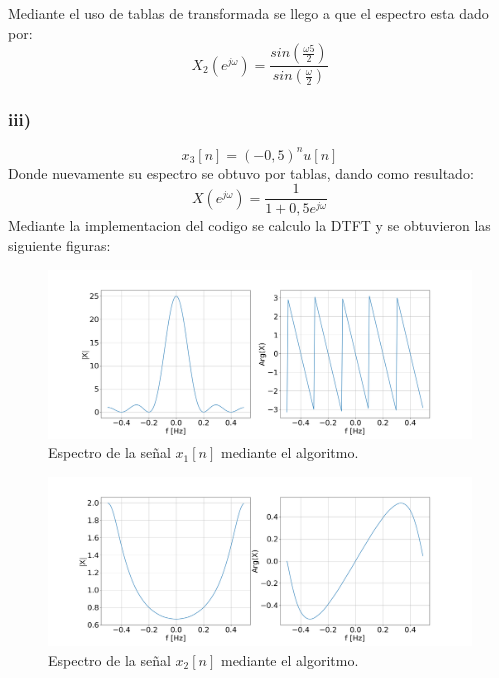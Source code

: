 \documentclass[letterpaper]{article}
\begin{document}
    Mediante el uso de tablas de transformada se llego a que el espectro esta dado por:
    \begin{equation}
    X_{2}(e^{j \omega})= \frac{sin(\frac{ \omega 5}{2})}{sin (\frac{\omega}{2})}
    \end{equation}

    \subsubsection*{iii)}
    \begin{equation} 
        x_{3}[n]=(-0,5)^{n}u[n]
    \end{equation}
    Donde nuevamente su espectro se obtuvo por tablas, dando como resultado:
    \begin{equation}
    X(e^{j \omega})=\frac{1}{1+0,5 e^{j \omega}}
    \end{equation}
    Mediante la implementacion del codigo se calculo la DTFT y se obtuvieron las siguiente figuras:
    \begin{figure}[H]
    \centering
    \includegraphics[width=\textwidth]{Img/punto_3_e_1.png}
    \caption{Espectro de la señal $x_{1}[n]$ mediante el algoritmo.}
    \label{fig.3ei}
    \end{figure} 

    \begin{figure}[H]
    \centering
    \includegraphics[width=\textwidth]{Img/punto_3_e_3.png}
    \caption{Espectro de la señal $x_{2}[n]$ mediante el algoritmo.}
    \label{fig.3eii}
    \end{figure}
\end{document}

